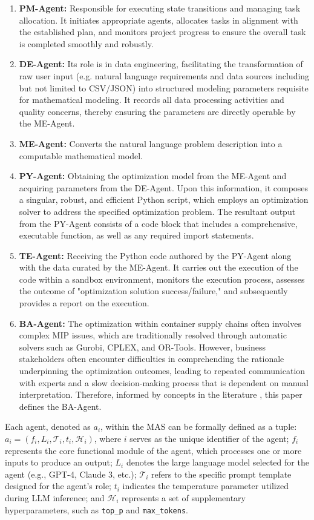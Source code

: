 \documentclass[preprint,12pt]{elsarticle}
\begin{document}
\begin{enumerate}[label=\arabic*)]
 \item \textbf{PM-Agent:} Responsible for executing state transitions and managing task allocation. It initiates appropriate agents, allocates tasks in alignment with the established plan, and monitors project progress to ensure the overall task is completed smoothly and robustly.
 \item \textbf{DE-Agent:} Its role is in data engineering, facilitating the transformation of raw user input (e.g. natural language requirements and data sources including but not limited to CSV/JSON) into structured modeling parameters requisite for mathematical modeling. It records all data processing activities and quality concerns, thereby ensuring the parameters are directly operable by the ME-Agent.
 \item \textbf{ME-Agent:} Converts the natural language problem description into a computable mathematical model.
 \item \textbf{PY-Agent:} Obtaining the optimization model from the ME-Agent and acquiring parameters from the DE-Agent. Upon this information, it composes a singular, robust, and efficient Python script, which employs an optimization solver to address the specified optimization problem. The resultant output from the PY-Agent consists of a code block that includes a comprehensive, executable function, as well as any required import statements.
 \item \textbf{TE-Agent:} Receiving the Python code authored by the PY-Agent along with the data curated by the ME-Agent. It carries out the execution of the code within a sandbox environment, monitors the execution process, assesses the outcome of "optimization solution success/failure," and subsequently provides a report on the execution.
 \item \textbf{BA-Agent:} The optimization within container supply chains often involves complex MIP issues, which are traditionally resolved through automatic solvers such as Gurobi, CPLEX, and OR-Tools. However, business stakeholders often encounter difficulties in comprehending the rationale underpinning the optimization outcomes, leading to repeated communication with experts and a slow decision-making process that is dependent on manual interpretation. Therefore, informed by concepts in the literature \cite{liLargeLanguageModels2023}, this paper defines the BA-Agent.
\end{enumerate}

Each agent, denoted as $a_i$, within the MAS can be formally defined as a tuple: $a_i=(f_i,L_i,\mathcal{T}_i,t_i,\mathcal{H}_i)$, where $i$ serves as the unique identifier of the agent; $f_i$ represents the core functional module of the agent, which processes one or more inputs to produce an output; $L_i$ denotes the large language model selected for the agent (e.g., GPT-4, Claude 3, etc.); $\mathcal{T}_i$ refers to the specific prompt template designed for the agent's role; $t_i$ indicates the temperature parameter utilized during LLM inference; and $\mathcal{H}_i$ represents a set of supplementary hyperparameters, such as \texttt{top\_p} and \texttt{max\_tokens}.
\end{document}
